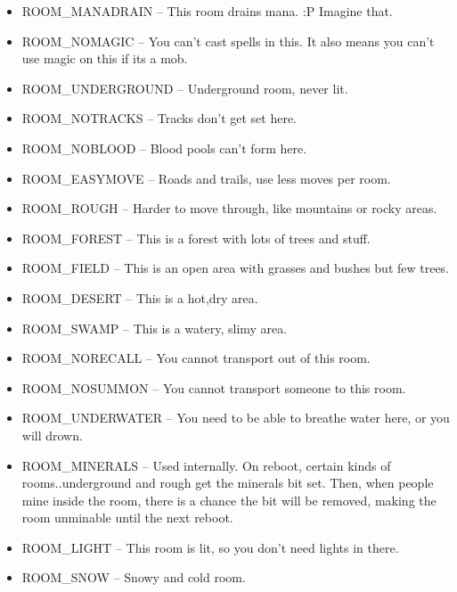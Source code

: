 \begin{itemize}
\begin{itemize}
\item ROOM\_MANADRAIN -- This room drains mana. :P Imagine that.

\item ROOM\_NOMAGIC -- You can't cast spells in this. It also means you can't use magic on this if its a mob.

\item ROOM\_UNDERGROUND -- Underground room, never lit.

\item ROOM\_NOTRACKS -- Tracks don't get set here.

\item ROOM\_NOBLOOD -- Blood pools can't form here.

\item ROOM\_EASYMOVE -- Roads and trails, use less moves per room.

\item ROOM\_ROUGH -- Harder to move through, like mountains or rocky areas.

\item ROOM\_FOREST -- This is a forest with lots of trees and stuff.

\item ROOM\_FIELD -- This is an open area with grasses and bushes but few trees.

\item ROOM\_DESERT -- This is a hot,dry area.

\item ROOM\_SWAMP -- This is a watery, slimy area.

\item ROOM\_NORECALL -- You cannot transport out of this room.

\item ROOM\_NOSUMMON -- You cannot transport someone to this room.

\item ROOM\_UNDERWATER -- You need to be able to breathe water here, or you will drown.

\item ROOM\_MINERALS -- Used internally. On reboot, certain kinds of rooms..underground and rough get the minerals bit set. Then, when people mine inside the room, there is a chance the bit will be removed, making the room unminable until the next reboot.

\item ROOM\_LIGHT -- This room is lit, so you don't need lights in there.

\item ROOM\_SNOW -- Snowy and cold room.
        


\end{itemize}
\end{itemize}
